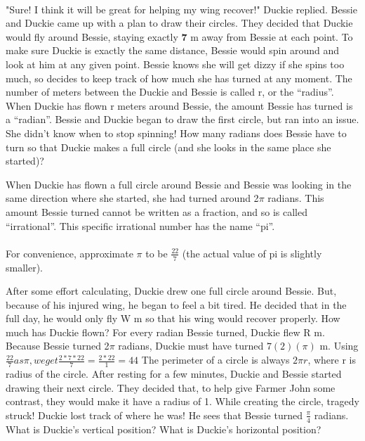 \paragraph{} "Sure! I think it will be great for helping my wing recover!" Duckie replied.
\vfill
\pagebreak
{}
{Bessie and Duckie came up with a plan to draw their circles. They decided that Duckie would fly around Bessie, staying exactly \textbf{7} m away from Bessie at each point. To make sure Duckie is exactly the same distance, Bessie would spin around and look at him at any given point. Bessie knows she will get dizzy if she spins too much, so decides to keep track of how much she has turned at any moment.}
{}
{The number of meters between the Duckie and Bessie is called r, or the “radius”. When Duckie has flown r meters around Bessie, the amount Bessie has turned is a “radian”.}
{}
{Bessie and Duckie began to draw the first circle, but ran into an issue. She didn't know when to stop spinning! How many radians does Bessie have to turn so that Duckie makes a full circle (and she looks in the same place she started)?}
{}
{When Duckie has flown a full circle around Bessie and Bessie was looking in the same direction where she started, she had turned around 2$\pi$ radians. This amount Bessie turned cannot be written as a fraction, and so is called “irrational”. This specific irrational number has the name “pi”. 
\paragraph{} For convenience, approximate $\pi$ to be $\frac{22}{7}$ (the actual value of pi is slightly smaller).}
{}
{After some effort calculating, Duckie drew one full circle around Bessie. But, because of his injured wing, he began to feel a bit tired. He decided that in the full day, he would only fly W m so that his wing would recover properly. How much has Duckie flown?}
{For every radian Bessie turned, Duckie flew R m. Because Bessie turned 2$\pi$ radians, Duckie must have turned $7(2)(\pi) $ m. Using $\frac{22}{7} as \pi, we get \frac{2*7*22}{7}=\frac{2*22}{1}=44$}
{The perimeter of a circle is always $2\pi r$, where r is radius of the circle.}
{}
{After resting for a few minutes, Duckie and Bessie started drawing their next circle. They decided that, to help give Farmer John some contrast, they would make it have a radius of 1. While creating the circle, tragedy struck! Duckie lost track of where he was! He sees that Bessie turned $\frac{\pi}{4}$ radians. What is Duckie's vertical position? What is Duckie's horizontal position?}
